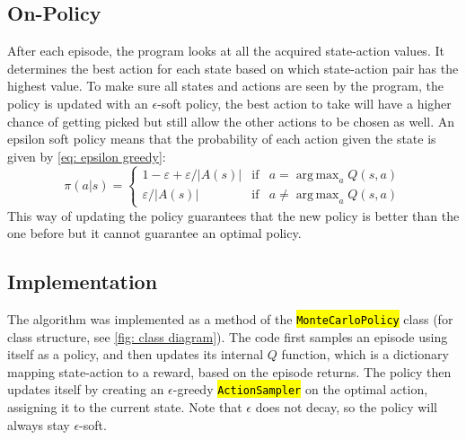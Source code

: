 \documentclass{class}
\def\code#1{\hl{\texttt{#1}}}
\DeclareMathOperator*{\argmax}{arg\,max}
\begin{document}
\subsection{On-Policy}
After each episode, the program looks at all the acquired state-action values. It determines the best action for each state based on which state-action pair has the highest value. To make sure all states and actions are seen by the program, the policy is updated with an $\epsilon$-soft policy, the best action to take will have a higher chance of getting picked but still allow the other actions to be chosen as well. An epsilon soft policy means that the probability of each action given the state is given by \autoref{eq: epsilon greedy}:
\begin{equation}
\label{eq: epsilon greedy}
    \pi (a|s)=\left\{ \begin{array}{rcl}
         1-\varepsilon+\varepsilon/|A(s)|& \mbox{if}& a = \argmax_a Q(s,a)  \\ \varepsilon/|A(s)|
         & \mbox{if} & a \neq \argmax_a Q(s,a)
    \end{array} \right.
\end{equation}
This way of updating the policy guarantees that the new policy is better than the one before but it cannot guarantee an optimal policy.

\subsection{Implementation}
The algorithm was implemented as a method of the \code{MonteCarloPolicy} class (for class structure, see \autoref{fig: class diagram}). The code first samples an episode using itself as a policy, and then updates its internal $Q$ function, which is a dictionary mapping state-action to a reward, based on the episode returns. The policy then updates itself by creating an $\epsilon$-greedy \code{ActionSampler} on the optimal action, assigning it to the current state. Note that $\epsilon$ does not decay, so the policy will always stay $\epsilon$-soft.
\end{document}
